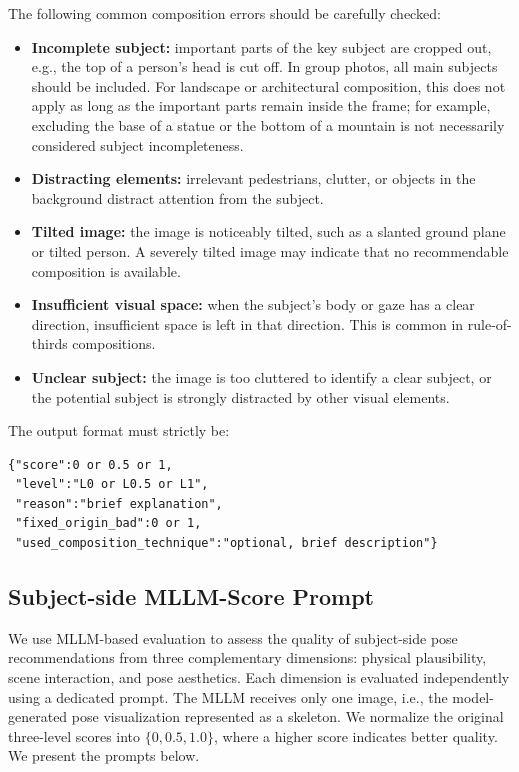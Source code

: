 \documentclass{article} %
\begin{document}
\begin{promptbox}
The following common composition errors should be carefully checked:
\begin{itemize}
    \item \textbf{Incomplete subject:} important parts of the key subject are cropped out, e.g., the top of a person's head is cut off. In group photos, all main subjects should be included. For landscape or architectural composition, this does not apply as long as the important parts remain inside the frame; for example, excluding the base of a statue or the bottom of a mountain is not necessarily considered subject incompleteness.
    \item \textbf{Distracting elements:} irrelevant pedestrians, clutter, or objects in the background distract attention from the subject.
    \item \textbf{Tilted image:} the image is noticeably tilted, such as a slanted ground plane or tilted person. A severely tilted image may indicate that no recommendable composition is available.
    \item \textbf{Insufficient visual space:} when the subject's body or gaze has a clear direction, insufficient space is left in that direction. This is common in rule-of-thirds compositions.
    \item \textbf{Unclear subject:} the image is too cluttered to identify a clear subject, or the potential subject is strongly distracted by other visual elements.
\end{itemize}

The output format must strictly be:
\begin{verbatim}
{"score":0 or 0.5 or 1,
 "level":"L0 or L0.5 or L1",
 "reason":"brief explanation",
 "fixed_origin_bad":0 or 1,
 "used_composition_technique":"optional, brief description"}
\end{verbatim}
\end{promptbox}
\subsection{Subject-side MLLM-Score Prompt}
\label{app:subject_mllm_score_prompt}

We use MLLM-based evaluation to assess the quality of subject-side pose recommendations from three complementary dimensions: physical plausibility, scene interaction, and pose aesthetics. Each dimension is evaluated independently using a dedicated prompt. The MLLM receives only one image, i.e., the model-generated pose visualization represented as a skeleton. We normalize the original three-level scores into \(\{0, 0.5, 1.0\}\), where a higher score indicates better quality. We present the prompts below.
\end{document}
